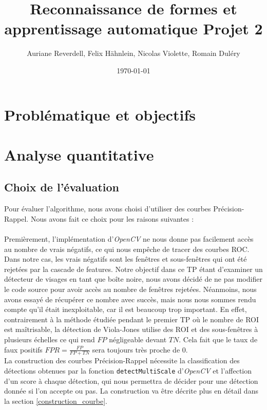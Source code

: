 \documentclass[a4paper,11pt]{article}
\title{Reconnaissance de formes et apprentissage automatique Projet 2}
\author{Auriane Reverdell, Felix Hähnlein, Nicolas Violette, Romain Duléry}
\date{\today}
\begin{document}
\maketitle
\vspace{1cm}

\section{Problématique et objectifs}

\section{Analyse quantitative}
    
    \subsection{Choix de l'évaluation}
        
        Pour évaluer l'algorithme, nous avons choisi d'utiliser des courbes Précision-Rappel. 
        Nous avons fait ce choix pour les raisons suivantes :\\\\
        Premièrement, l'implémentation d'{\it OpenCV} ne nous donne pas facilement accès au nombre de vrais négatifs, ce qui nous empêche de tracer des courbes ROC.
        Dans notre cas, les vrais négatifs sont les fenêtres et sous-fenêtres qui ont été rejetées par la cascade de features.
        Notre objectif dans ce TP étant d'examiner un détecteur de visages en tant que boîte noire, nous avons décidé de ne pas modifier le code source pour avoir accès au nombre de fenêtres rejetées.
        Néanmoins, nous avons essayé de récupérer ce nombre avec succès, mais nous nous sommes rendu compte qu'il était inexploitable, car il est beaucoup trop important.
        En effet, contrairement à la méthode étudiée pendant le premier TP où le nombre de ROI est maîtrisable, la détection de Viola-Jones utilise des ROI et des sous-fenêtres à plusieurs échelles ce qui rend $FP$ négligeable devant $TN$.
        Cela fait que le taux de faux positifs $FPR = \frac{FP}{FP+TN}$ sera toujours très proche de $0$.
        \\
        La construction des courbes Précision-Rappel nécessite la classification des détections obtenues par la fonction \verb!detectMultiScale! d'{\it OpenCV} et l'affection d'un score à chaque détection, qui nous permettra de décider pour une détection donnée si l'on accepte ou pas. La construction va être décrite plus en détail dans la section  \ref{construction_courbe}.
        
\end{document}
